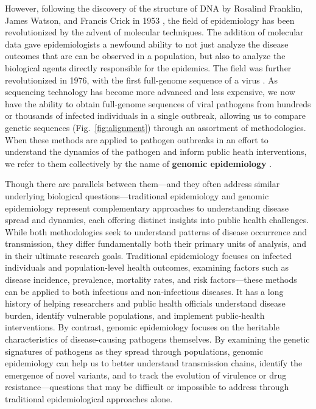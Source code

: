 However, following the discovery of the structure of DNA by Rosalind Franklin, James Watson, and Francis Crick in 1953 \citep{franklin1953molecular,watson1953molecular}, the field of epidemiology has been revolutionized by the advent of molecular techniques.
The addition of molecular data gave epidemiologists a newfound ability to not just analyze the disease outcomes that are can be observed in a population, but also to analyze the biological agents directly responsible for the epidemics.
The field was further revolutionized in 1976, with the first full-genome sequence of a virus \citep{fiers1976complete}.
As sequencing technology has become more advanced and less expensive, we now have the ability to obtain full-genome sequences of viral pathogens from hundreds or thousands of infected individuals in a single outbreak, allowing us to compare genetic sequences (Fig.~\ref{fig:alignment}) through an assortment of methodologies.
When these methods are applied to pathogen outbreaks in an effort to understand the dynamics of the pathogen and inform public heath interventions, we refer to them collectively by the name of \textbf{genomic epidemiology} \citep{armstrong2019pathogen,black2024applied}.

Though there are parallels between them---and they often address similar underlying biological questions---traditional epidemiology and genomic epidemiology represent complementary approaches to understanding disease spread and dynamics, each offering distinct insights into public health challenges.
While both methodologies seek to understand patterns of disease occurrence and transmission, they differ fundamentally both their primary units of analysis, and in their ultimate research goals.
Traditional epidemiology focuses on infected individuals and population-level health outcomes, examining factors such as disease incidence, prevalence, mortality rates, and risk factors---these methods can be applied to both infectious and non-infectious diseases.
It has a long history of helping researchers and public health officials understand disease burden, identify vulnerable populations, and implement public-health interventions.
By contrast, genomic epidemiology focuses on the heritable characteristics of disease-causing pathogens themselves.
By examining the genetic signatures of pathogens as they spread through populations, genomic epidemiology can help us to better understand transmission chains, identify the emergence of novel variants, and to track the evolution of virulence or drug resistance---questions that may be difficult or impossible to address through traditional epidemiological approaches alone.

